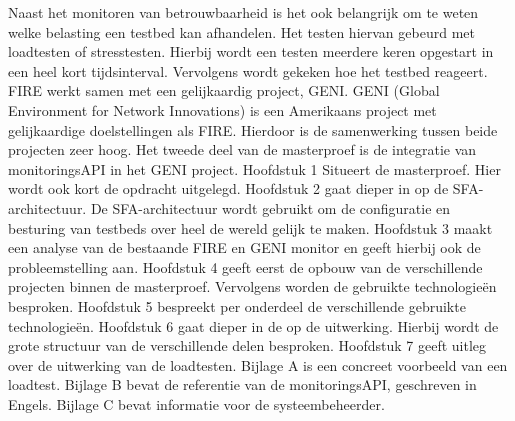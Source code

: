 \npar
Naast het monitoren van betrouwbaarheid is het ook belangrijk om te weten welke belasting een testbed kan afhandelen. Het testen hiervan gebeurd met loadtesten of stresstesten. Hierbij wordt een testen meerdere keren opgestart in een heel kort tijdsinterval. Vervolgens wordt gekeken hoe het testbed reageert.
\npar
FIRE werkt samen met een gelijkaardig project, GENI. GENI (Global Environment for Network Innovations) is een Amerikaans project met gelijkaardige doelstellingen als FIRE. Hierdoor is de samenwerking tussen beide projecten zeer hoog. Het tweede deel van de masterproef is de integratie van monitoringsAPI in het GENI project.
\npar
Hoofdstuk 1 Situeert de masterproef. Hier wordt ook kort de opdracht uitgelegd.
\npar
Hoofdstuk 2 gaat dieper in op de SFA-architectuur. De SFA-architectuur wordt gebruikt om de configuratie en besturing van testbeds over heel de wereld gelijk te maken.
\npar
Hoofdstuk 3 maakt een analyse van de bestaande FIRE en GENI monitor en geeft hierbij ook de probleemstelling aan.
\npar
Hoofdstuk 4 geeft eerst de opbouw van de verschillende projecten binnen de masterproef. Vervolgens worden de gebruikte technologie\"en besproken.
\npar
Hoofdstuk 5 bespreekt per onderdeel de verschillende gebruikte technologie\"en.
\npar
Hoofdstuk 6 gaat dieper in de op de uitwerking. Hierbij wordt de grote structuur van de verschillende delen besproken.
\npar
Hoofdstuk 7 geeft uitleg over de uitwerking van de loadtesten.
\npar
Bijlage A is een concreet voorbeeld van een loadtest.
\npar
Bijlage B bevat de referentie van de monitoringsAPI, geschreven in Engels.
\npar
Bijlage C bevat informatie voor de systeembeheerder.
